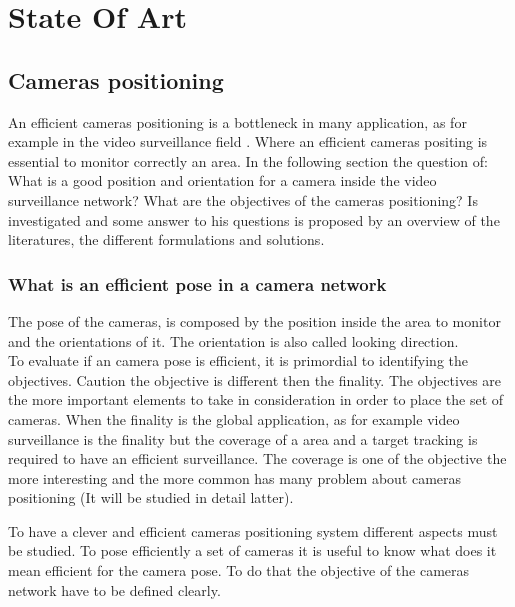 \chapter{State Of Art}\label{chap:stateOfTheArt}

\minitoc


\section{Cameras positioning }\label{sec:camerasPositioning}
An efficient cameras positioning is a bottleneck in many application, as for example in the video surveillance field \cite{11*herrera2012,12*soto2009,18*ding2012,151*zhao2013,84*xu2011}. Where an efficient cameras positing is essential to monitor correctly an area.  
In the following section the question of: 
What is a good position and orientation for a camera inside the video surveillance network?
What are the objectives of the cameras positioning?
Is investigated and  some answer to his questions is proposed by an overview of the literatures, the different formulations and solutions. 


\subsection{What is an efficient pose in a camera network}
The pose of the cameras,  is composed by the position inside the area to monitor and the orientations of it. The orientation is also called looking direction.\\ 
To evaluate if an camera  pose is efficient, it is primordial to identifying the objectives. Caution the objective is different then the finality. The objectives are the more important elements to take in consideration in order to place the set of cameras. When the finality is the global application, as for example video surveillance is the finality but the coverage of a area  and a target tracking  is required to have an efficient surveillance.  The coverage is one of the objective the more interesting and the more common has many problem about cameras positioning (It will be studied in detail latter).


To have a clever and efficient cameras positioning system different aspects must be studied. To pose efficiently a set of cameras it is useful to know what does it mean efficient  for  the  camera pose. To do that the objective of the cameras network have to be defined clearly. 

